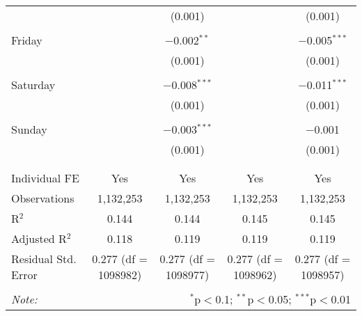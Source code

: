 \documentclass[
]{article}
\begin{document}
\begin{table}[!htbp]
{\begin{tabular}{@{\extracolsep{5pt}}lcccc}
  &  & (0.001) &  & (0.001) \\ 
  & & & & \\ 
 Friday &  & $-$0.002$^{**}$ &  & $-$0.005$^{***}$ \\ 
  &  & (0.001) &  & (0.001) \\ 
  & & & & \\ 
 Saturday &  & $-$0.008$^{***}$ &  & $-$0.011$^{***}$ \\ 
  &  & (0.001) &  & (0.001) \\ 
  & & & & \\ 
 Sunday &  & $-$0.003$^{***}$ &  & $-$0.001 \\ 
  &  & (0.001) &  & (0.001) \\ 
  & & & & \\ 
\hline \\[-1.8ex] 
Individual FE & Yes & Yes & Yes & Yes \\ 
Observations & 1,132,253 & 1,132,253 & 1,132,253 & 1,132,253 \\ 
R$^{2}$ & 0.144 & 0.144 & 0.145 & 0.145 \\ 
Adjusted R$^{2}$ & 0.118 & 0.119 & 0.119 & 0.119 \\ 
Residual Std. Error & 0.277 (df = 1098982) & 0.277 (df = 1098977) & 0.277 (df = 1098962) & 0.277 (df = 1098957) \\ 
\hline 
\hline \\[-1.8ex] 
\textit{Note:}  & \multicolumn{4}{r}{$^{*}$p$<$0.1; $^{**}$p$<$0.05; $^{***}$p$<$0.01} \\ 
\end{tabular}
} 
\end{table}
\end{document}
